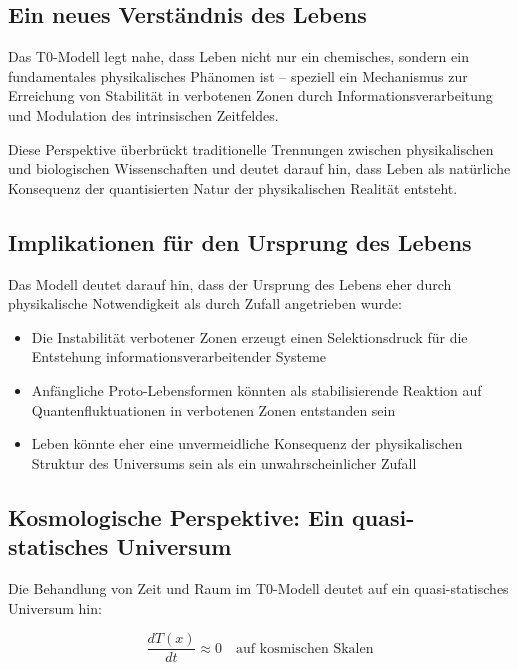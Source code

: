 \documentclass[12pt,a4paper]{article}
\newcommand{\Tfield}{T(x)}
\begin{document}
	\subsection{Ein neues Verständnis des Lebens}
	\label{subsec:new_understanding}
	
	Das T0-Modell legt nahe, dass Leben nicht nur ein chemisches, sondern ein fundamentales physikalisches Phänomen ist – speziell ein Mechanismus zur Erreichung von Stabilität in verbotenen Zonen durch Informationsverarbeitung und Modulation des intrinsischen Zeitfeldes.
	
	Diese Perspektive überbrückt traditionelle Trennungen zwischen physikalischen und biologischen Wissenschaften und deutet darauf hin, dass Leben als natürliche Konsequenz der quantisierten Natur der physikalischen Realität entsteht.
	
	\subsection{Implikationen für den Ursprung des Lebens}
	\label{subsec:origin_implications}
	
	Das Modell deutet darauf hin, dass der Ursprung des Lebens eher durch physikalische Notwendigkeit als durch Zufall angetrieben wurde:
	
	\begin{itemize}
		\item Die Instabilität verbotener Zonen erzeugt einen Selektionsdruck für die Entstehung informationsverarbeitender Systeme
		\item Anfängliche Proto-Lebensformen könnten als stabilisierende Reaktion auf Quantenfluktuationen in verbotenen Zonen entstanden sein
		\item Leben könnte eher eine unvermeidliche Konsequenz der physikalischen Struktur des Universums sein als ein unwahrscheinlicher Zufall
	\end{itemize}
	
	\subsection{Kosmologische Perspektive: Ein quasi-statisches Universum}
	\label{subsec:cosmological_perspective}
	
	Die Behandlung von Zeit und Raum im T0-Modell deutet auf ein quasi-statisches Universum hin:
	
	\begin{equation}
		\frac{d\Tfield}{dt} \approx 0 \quad \textrm{auf kosmischen Skalen}
	\end{equation}
	
\end{document}
